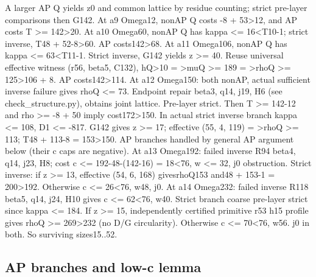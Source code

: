 \documentclass[11pt,a4paper]{article}
\begin{document}
A larger AP Q yields z0 and common lattice by residue counting; strict
pre-layer comparisons then G142. At a9 Omega12, nonAP Q costs -8 +
53\textgreater12, and AP costs T \textgreater= 142\textgreater20. At a10
Omega60, nonAP Q has kappa \textless= 16\textless T10-1; strict inverse,
T48 + 52-8\textgreater60. AP costs142\textgreater68. At a11 Omega106,
nonAP Q has kappa \textless= 63\textless T11-1. Strict inverse, G142
yields z \textgreater= 40. Reuse universal effective witness (r56,
beta5, C132), hQ\textgreater10 = \textgreater muQ \textgreater= 189 =
\textgreater rhoQ \textgreater= 125\textgreater106 + 8. AP
costs142\textgreater114. At a12 Omega150: both nonAP, actual sufficient
inverse failure gives rhoQ \textless= 73. Endpoint repair beta3, q14,
j19, H6 (see check\_structure.py), obtains joint lattice. Pre-layer
strict. Then T \textgreater= 142-12 and rho \textgreater= -8 + 50 imply
cost172\textgreater150. In actual strict inverse branch kappa \textless=
108, D1 \textless= -817. G142 gives z \textgreater= 17; effective (55,
4, 119) = \textgreater rhoQ \textgreater= 113; T48 + 113-8 =
153\textgreater150. AP branches handled by general AP argument below
(their c caps are negative). At a13 Omega192: failed inverse R94 beta4,
q14, j23, H8; cost c \textless= 192-48-(142-16) = 18\textless76, w
\textless= 32, j0 obstruction. Strict inverse: if z \textgreater= 13,
effective (54, 6, 168) givesrhoQ153 and48 + 153-1 = 200\textgreater192.
Otherwise c \textless= 26\textless76, w48, j0. At a14 Omega232: failed
inverse R118 beta5, q14, j24, H10 gives c \textless= 62\textless76, w40.
Strict branch coarse pre-layer strict since kappa \textless= 184. If z
\textgreater= 15, independently certified primitive r53 h15 profile
gives rhoQ \textgreater= 269\textgreater232 (no D/G circularity).
Otherwise c \textless= 70\textless76, w56. j0 in both. So surviving
sizes15..52.

\hypertarget{ap-branches-and-low-c-lemma}{%
\subsection{AP branches and low-c
lemma}\label{ap-branches-and-low-c-lemma}}
\end{document}
